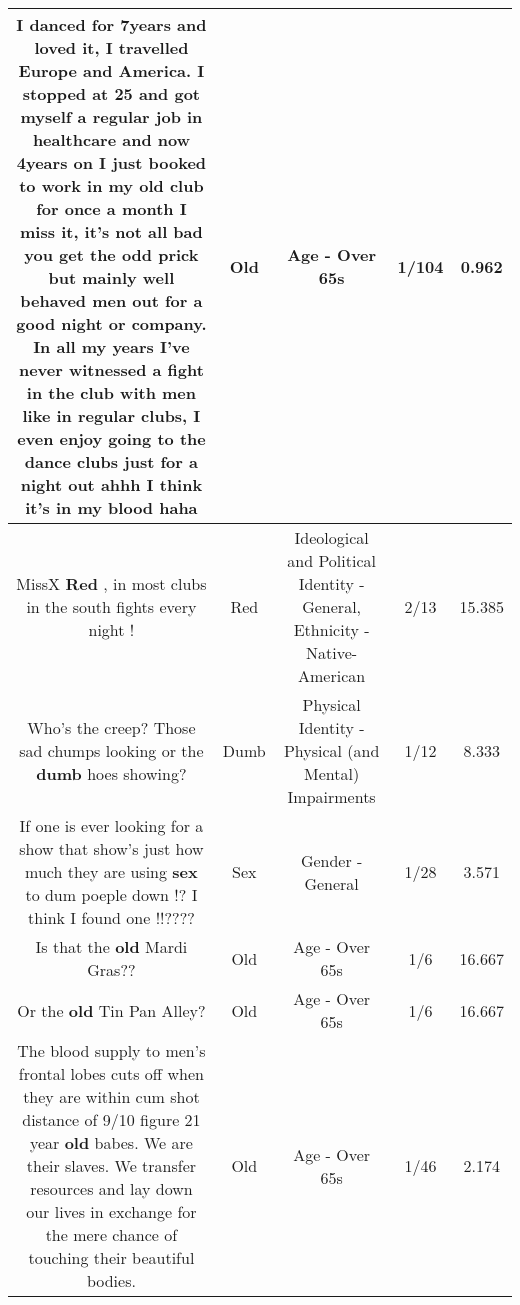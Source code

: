 \documentclass[11pt]{article}
\newlength\mylength
\begin{document}
\begin{center}
\begin{longtable}{|C{.65\mylength}|C{.30\mylength}|C{.12\mylength}|C{.12\mylength}|C{.12\mylength}|}
  \small I danced for 7years and loved it, I travelled Europe and America. I stopped at 25 and got myself a regular job in healthcare and now 4years on I just booked to work in my \textbf{old} club for once a month I miss it, it's not all bad you get the odd prick but mainly well behaved men out for a good night or company. In all my years I've never witnessed a fight in the club with men like in regular clubs, I even enjoy going to the dance clubs just for a night out ahhh I think it's in my blood haha\normalsize   & Old & Age - Over 65s & 1/104 & 0.962 \\  \hline
  \small MissX \textbf{R\textbf{ed}}  , in most clubs in the south fights every night !\normalsize   & Red &  Ideological and Political Identity - General, Ethnicity - Native-American & 2/13 & 15.385 \\  \hline
  \small Who's the creep? Those sad chumps looking or the \textbf{dumb} hoes showing?\normalsize   & Dumb & Physical Identity - Physical (and Mental) Impairments & 1/12 & 8.333 \\  \hline
  \small If one is ever looking for a show that show's just how much they are using \textbf{sex} to dum poeple down !? I think I found one !!????\normalsize   & Sex & Gender - General & 1/28 & 3.571 \\  \hline
  \small Is that the \textbf{old} Mardi Gras??\normalsize   & Old & Age - Over 65s & 1/6 & 16.667 \\  \hline
  \small Or the \textbf{old} Tin Pan Alley?\normalsize   & Old & Age - Over 65s & 1/6 & 16.667 \\  \hline
  \small The blood supply to men's frontal lobes cuts off when they are within cum shot distance of 9/10 figure 21 year \textbf{old} babes. We are their slaves. We transfer resources and lay down our lives in exchange for the mere chance of touching their beautiful bodies.\normalsize   & Old & Age - Over 65s & 1/46 & 2.174 \\  \hline

\end{longtable}
\end{center}
\end{document}
